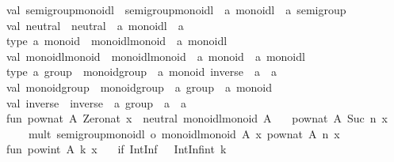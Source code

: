 \begin{isabellebody}
\begin{isamarkuptext}
\begin{typewriter}
val\ semigroup{\isacharunderscore}monoidl\ {\isacharequal}\ {\isacharhash}semigroup{\isacharunderscore}monoidl\ {\isacharcolon}\ {\isacharprime}a\ monoidl\ {\isacharminus}{\isachargreater}\ {\isacharprime}a\ semigroup{\isacharsemicolon}\isanewline
val\ neutral\ {\isacharequal}\ {\isacharhash}neutral\ {\isacharcolon}\ {\isacharprime}a\ monoidl\ {\isacharminus}{\isachargreater}\ {\isacharprime}a{\isacharsemicolon}\isanewline
\isanewline
type\ {\isacharprime}a\ monoid\ {\isacharequal}\ {\isacharbraceleft}monoidl{\isacharunderscore}monoid\ {\isacharcolon}\ {\isacharprime}a\ monoidl{\isacharbraceright}{\isacharsemicolon}\isanewline
val\ monoidl{\isacharunderscore}monoid\ {\isacharequal}\ {\isacharhash}monoidl{\isacharunderscore}monoid\ {\isacharcolon}\ {\isacharprime}a\ monoid\ {\isacharminus}{\isachargreater}\ {\isacharprime}a\ monoidl{\isacharsemicolon}\isanewline
\isanewline
type\ {\isacharprime}a\ group\ {\isacharequal}\ {\isacharbraceleft}monoid{\isacharunderscore}group\ {\isacharcolon}\ {\isacharprime}a\ monoid{\isacharcomma}\ inverse\ {\isacharcolon}\ {\isacharprime}a\ {\isacharminus}{\isachargreater}\ {\isacharprime}a{\isacharbraceright}{\isacharsemicolon}\isanewline
val\ monoid{\isacharunderscore}group\ {\isacharequal}\ {\isacharhash}monoid{\isacharunderscore}group\ {\isacharcolon}\ {\isacharprime}a\ group\ {\isacharminus}{\isachargreater}\ {\isacharprime}a\ monoid{\isacharsemicolon}\isanewline
val\ inverse\ {\isacharequal}\ {\isacharhash}inverse\ {\isacharcolon}\ {\isacharprime}a\ group\ {\isacharminus}{\isachargreater}\ {\isacharprime}a\ {\isacharminus}{\isachargreater}\ {\isacharprime}a{\isacharsemicolon}\isanewline
\isanewline
fun\ pow{\isacharunderscore}nat\ A{\isacharunderscore}\ Zero{\isacharunderscore}nat\ x\ {\isacharequal}\ neutral\ {\isacharparenleft}monoidl{\isacharunderscore}monoid\ A{\isacharunderscore}{\isacharparenright}\isanewline
\ \ {\isacharbar}\ pow{\isacharunderscore}nat\ A{\isacharunderscore}\ {\isacharparenleft}Suc\ n{\isacharparenright}\ x\ {\isacharequal}\isanewline
\ \ \ \ mult\ {\isacharparenleft}{\isacharparenleft}semigroup{\isacharunderscore}monoidl\ o\ monoidl{\isacharunderscore}monoid{\isacharparenright}\ A{\isacharunderscore}{\isacharparenright}\ x\ {\isacharparenleft}pow{\isacharunderscore}nat\ A{\isacharunderscore}\ n\ x{\isacharparenright}{\isacharsemicolon}\isanewline
\isanewline
fun\ pow{\isacharunderscore}int\ A{\isacharunderscore}\ k\ x\ {\isacharequal}\isanewline
\ \ {\isacharparenleft}if\ IntInf{\isachardot}{\isacharless}{\isacharequal}\ {\isacharparenleft}{\isacharparenleft}{}\ {\isacharcolon}\ IntInf{\isachardot}int{\isacharparenright}{\isacharcomma}\ k{\isacharparenright}\isanewline

\end{typewriter}
\end{isamarkuptext}
\end{isabellebody}
